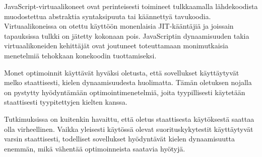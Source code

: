 JavaScript-virtuaalikoneet ovat perinteisesti toimineet tulkkaamalla lähdekoodista muodostettua abstraktia syntaksipuuta tai käännettyä tavukoodia. Virtuaalikoneissa on otettu käyttöön monenlaisia JIT-kääntäjiä ja joissain tapauksissa tulkki on jätetty kokonaan pois. JavaScriptin dynaamisuuden takia virtuaalikoneiden kehittäjät ovat joutuneet toteuttamaan monimutkaisia menetelmiä tehokkaan konekoodin tuottamiseksi.

Monet optimoinnit käyttävät hyväksi oletusta, että sovellukset käyttäytyvät melko staattisesti, kielen dynaamisuudesta huolimatta. Tämän oletuksen nojalla on pystytty hyödyntämään optimointimenetelmiä, joita tyypillisesti käytetään staattisesti tyypitettyjen kielten kanssa.

Tutkimuksissa on kuitenkin havaittu, että oletus staattisesta käytöksestä saattaa olla virheellinen. Vaikka yleisesti käytössä olevat suorituskykytestit käyttäytyvät varsin staattisesti, todelliset sovellukset hyödyntävät kielen dynaamisuutta enemmän, mikä vähentää optimoinneista saatavia hyötyjä.

